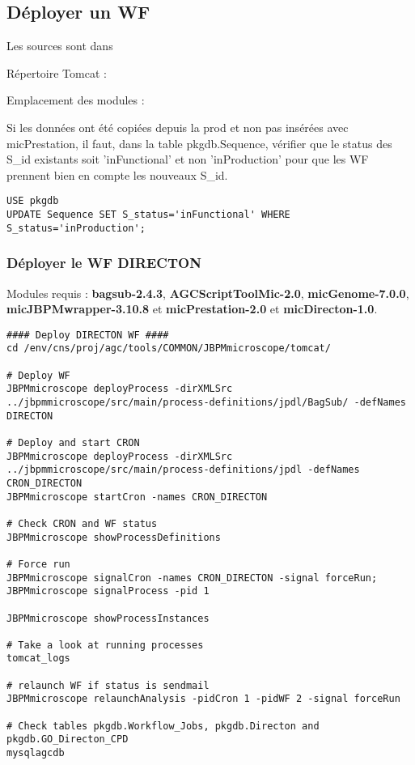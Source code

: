 \subsection{Déployer un WF}
Les sources sont dans 
\newline

Répertoire Tomcat : 
\newline

Emplacement des modules : 
\newline

\begin{mycolorbox}
	Si les données ont été copiées depuis la prod et non pas insérées avec micPrestation, il faut, dans la table pkgdb.Sequence, vérifier que le status des S\_id existants soit 'inFunctional' et non 'inProduction' pour que les WF prennent bien en compte les nouveaux S\_id.
\end{mycolorbox}

\begin{lstlisting}[style=SQL]
USE pkgdb
UPDATE Sequence SET S_status='inFunctional' WHERE S_status='inProduction';
\end{lstlisting}

\subsubsection{Déployer le WF DIRECTON}
Modules requis : \textbf{bagsub-2.4.3}, \textbf{AGCScriptToolMic-2.0}, \textbf{micGenome-7.0.0}, \textbf{micJBPMwrapper-3.10.8} et \textbf{micPrestation-2.0} et \textbf{micDirecton-1.0}.

\begin{lstlisting}[style=bash]
#### Deploy DIRECTON WF ####
cd /env/cns/proj/agc/tools/COMMON/JBPMmicroscope/tomcat/

# Deploy WF
JBPMmicroscope deployProcess -dirXMLSrc ../jbpmmicroscope/src/main/process-definitions/jpdl/BagSub/ -defNames DIRECTON

# Deploy and start CRON
JBPMmicroscope deployProcess -dirXMLSrc ../jbpmmicroscope/src/main/process-definitions/jpdl -defNames CRON_DIRECTON
JBPMmicroscope startCron -names CRON_DIRECTON

# Check CRON and WF status
JBPMmicroscope showProcessDefinitions

# Force run
JBPMmicroscope signalCron -names CRON_DIRECTON -signal forceRun; JBPMmicroscope signalProcess -pid 1

JBPMmicroscope showProcessInstances

# Take a look at running processes
tomcat_logs

# relaunch WF if status is sendmail
JBPMmicroscope relaunchAnalysis -pidCron 1 -pidWF 2 -signal forceRun

# Check tables pkgdb.Workflow_Jobs, pkgdb.Directon and pkgdb.GO_Directon_CPD
mysqlagcdb
\end{lstlisting}